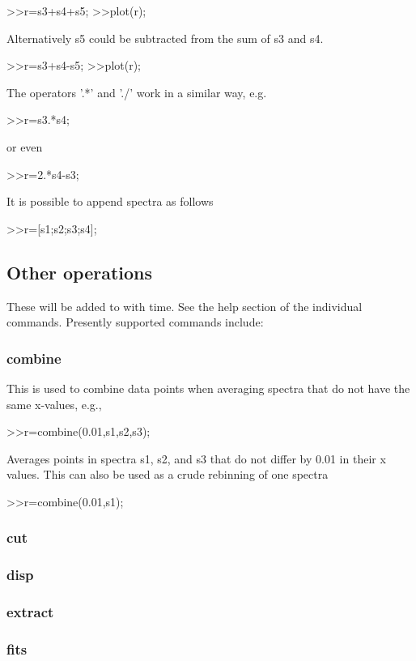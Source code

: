\documentclass[a4paper]{article}
\begin{document}
>>r=s3+s4+s5;
>>plot(r);

Alternatively s5 could be subtracted from the sum of 
s3 and s4.

>>r=s3+s4-s5;
>>plot(r);

The operators '.*' and './' work in a similar way,
e.g.

>>r=s3.*s4;

or even

>>r=2.*s4-s3;

It is possible to append spectra as follows

>>r=[s1;s2;s3;s4];

\subsection{Other operations}

These will be added to with time.
See the help section of the individual commands. 
Presently supported commands include:

\subsubsection{combine}

This is used to combine data points when averaging spectra that 
do not have the same x-values, e.g.,

>>r=combine(0.01,s1,s2,s3);

Averages points in spectra s1, s2, and s3 that do not differ by 
0.01 in their x values. This can also be used as a crude rebinning
of one spectra

>>r=combine(0.01,s1);

\subsubsection{cut}

\subsubsection{disp}

\subsubsection{extract}

\subsubsection{fits}
\end{document}
